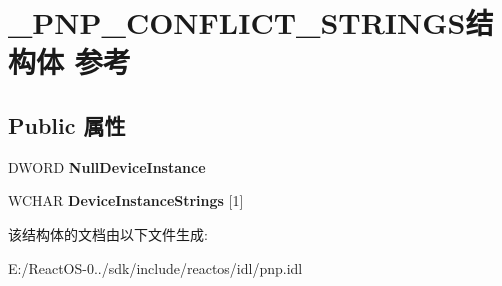 \hypertarget{struct___p_n_p___c_o_n_f_l_i_c_t___s_t_r_i_n_g_s}{}\section{\+\_\+\+P\+N\+P\+\_\+\+C\+O\+N\+F\+L\+I\+C\+T\+\_\+\+S\+T\+R\+I\+N\+G\+S结构体 参考}
\label{struct___p_n_p___c_o_n_f_l_i_c_t___s_t_r_i_n_g_s}
\subsection*{Public 属性}
\begin{DoxyCompactItemize}
\item 
\mbox{\label{struct___p_n_p___c_o_n_f_l_i_c_t___s_t_r_i_n_g_s_a0d8a7c40ad6eaaac299cbbb69c6501e2}} 
D\+W\+O\+RD {\bfseries Null\+Device\+Instance}
\item 
\mbox{\label{struct___p_n_p___c_o_n_f_l_i_c_t___s_t_r_i_n_g_s_a80d229e977dc2400639f1621542e18df}} 
W\+C\+H\+AR {\bfseries Device\+Instance\+Strings} \mbox{[}1\mbox{]}
\end{DoxyCompactItemize}


该结构体的文档由以下文件生成\+:\begin{DoxyCompactItemize}
\item 
E\+:/\+React\+O\+S-\/0../sdk/include/reactos/idl/pnp.\+idl\end{DoxyCompactItemize}

